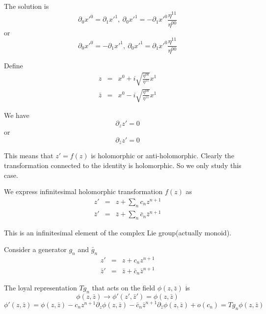 \documentclass[12pt]{book}
\begin{document}
	The solution is
	\begin{equation}
		\partial_0 x'^0=\partial_1 x'^1,\ \partial_0 x'^1=-\partial_1 x'^0\frac{\eta^{11}}{\eta^{00}}
	\end{equation}
	or
	\begin{equation}
		\partial_0 x'^0=-\partial_1 x'^1,\ \partial_0 x'^1=\partial_1 x'^0\frac{\eta^{11}}{\eta^{00}}
	\end{equation}
	
	Define
	\begin{eqnarray}
		z&=&x^0+i\sqrt{\frac{\eta^{00}}{\eta^{11}}}x^1\\
		\bar z&=&x^0-i\sqrt{\frac{\eta^{00}}{\eta^{11}}}x^1
	\end{eqnarray}
	
	We have
	\begin{equation}
		\partial_zz'=0
	\end{equation}
	or
	\begin{equation}
		\partial_{\bar z}z'=0
	\end{equation}
	
	This means that $z'=f(z)$ is holomorphic or anti-holomorphic. Clearly the transformation connected to the identity is holomorphic. So we only study this case.
	
	We express infinitesimal holomorphic transformation $f(z)$ as
	\begin{eqnarray}
		z'&=&z+\sum_nc_nz^{n+1}\\
		\bar z'&=&\bar z+\sum_n\bar c_n\bar z^{n+1}
	\end{eqnarray}
	
	This is an infinitesimal element of the complex Lie group(actually monoid). 
	
	Consider a generator $g_n$ and $\bar g_n$
	\begin{eqnarray}
		z'&=&z+c_nz^{n+1}\\
		\bar z'&=&\bar z+\bar c_n\bar z^{n+1}
	\end{eqnarray}
	
	The loyal representation $Tg_n$ that acts on the field $\phi(z,\bar z)$ is
	\begin{equation}
		\phi(z,\bar z)\rightarrow\phi'(z',\bar z')=\phi(z,\bar z)
	\end{equation}
	\begin{equation}
		\phi'(z,\bar z)=\phi(z,\bar z)-c_nz^{n+1}\partial_z\phi(z,\bar z)-\bar c_n\bar z^{n+1}\partial_{\bar z}\phi(z,\bar z)+o(c_n)=Tg_n\phi(z,\bar z)
	\end{equation}
	
\end{document}
